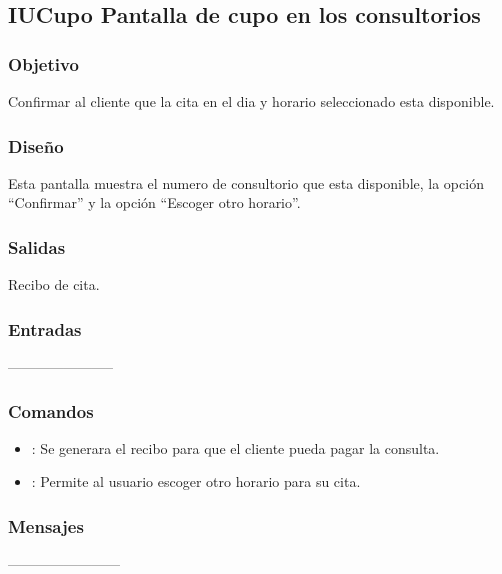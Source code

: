 \subsection{IUCupo Pantalla de cupo en los consultorios}

\subsubsection{Objetivo}
	Confirmar al cliente que la cita en el d\´ia y horario seleccionado esta disponible.

\subsubsection{Diseño}
	Esta pantalla muestra el numero de consultorio que esta disponible, la opci\'on "`Confirmar"' y la opci\'on "`Escoger otro horario"'.

    
\subsubsection{Salidas}
    Recibo de cita.

\subsubsection{Entradas}
-----------------------

\subsubsection{Comandos}
\begin{itemize}
		\item {}: Se generara el recibo para que el cliente pueda pagar la consulta.
		\item {}: Permite al usuario escoger otro horario para su cita.
\end{itemize}

\subsubsection{Mensajes}
------------------------